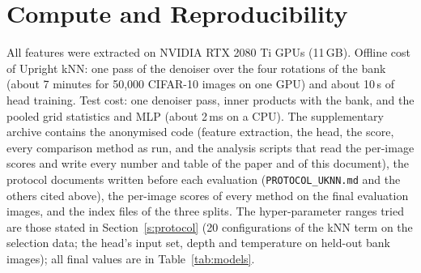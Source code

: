 \documentclass[10pt]{article}
\begin{document}
\section{Compute and Reproducibility}
\label{s:repro}
All features were extracted on NVIDIA RTX 2080 Ti GPUs (11\,GB). Offline cost of Upright kNN: one pass of the denoiser over the four rotations of the bank (about 7 minutes for 50{,}000 CIFAR-10 images on one GPU) and about 10\,s of head training. Test cost: one denoiser pass, inner products with the bank, and the pooled grid statistics and MLP (about 2\,ms on a CPU). The supplementary archive contains the anonymised code (feature extraction, the head, the score, every comparison method as run, and the analysis scripts that read the per-image scores and write every number and table of the paper and of this document), the protocol documents written before each evaluation (\texttt{PROTOCOL\_UKNN.md} and the others cited above), the per-image scores of every method on the final evaluation images, and the index files of the three splits. The hyper-parameter ranges tried are those stated in Section~\ref{s:protocol} (20 configurations of the kNN term on the selection data; the head's input set, depth and temperature on held-out bank images); all final values are in Table~\ref{tab:models}.



\end{document}
